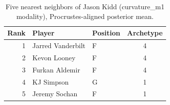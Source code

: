 \begin{table}[htbp]
  \centering\small
  \begin{tabular}{rllc}
    \toprule
    Rank & Player & Position & Archetype \\
    \midrule
    1 & Jarred Vanderbilt & F & 4 \\
    2 & Kevon Looney & F & 4 \\
    3 & Furkan Aldemir & F & 4 \\
    4 & KJ Simpson & G & 1 \\
    5 & Jeremy Sochan & F & 1 \\
    \bottomrule
  \end{tabular}
  \caption{Five nearest neighbors of Jason Kidd (curvature_m1 modality), Procrustes-aligned posterior mean.}
  \label{tab:Jason_Kidd_neighbors_curvature_m1}
\end{table}


